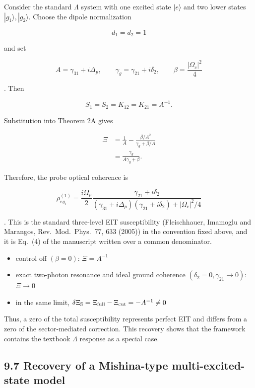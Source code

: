 \documentclass[
  10pt,
  a4paper,
]{article}
\providecommand{\tightlist}{%
  \setlength{\itemsep}{0pt}\setlength{\parskip}{0pt}}
\begin{document}
Consider the standard \(\Lambda\) system with one excited state
\(|e\rangle\) and two lower states \(|g_1\rangle,|g_2\rangle\). Choose
the dipole normalization

\[
d_1=d_2=1
\]

and set

\[
A=\gamma_{31}+i\Delta_p,
\qquad
\gamma_g=\gamma_{21}+i\delta_2,
\qquad
\beta=\frac{|\Omega_c|^2}{4}
\]

. Then

\[
S_1=S_2=K_{12}=K_{21}=A^{-1}.
\]

Substitution into Theorem 2A gives

\[
\begin{aligned}
\Xi
&=\frac1A-
\frac{\beta/A^2}{\gamma_g+\beta/A}\\
&=\boxed{
\frac{\gamma_g}{A\gamma_g+\beta}
}.
\end{aligned}
\]

Therefore, the probe optical coherence is

\[
\boxed{
\rho_{eg_1}^{(1)}
=\frac{i\Omega_p}{2}
\frac{\gamma_{21}+i\delta_2}
{(\gamma_{31}+i\Delta_p)(\gamma_{21}+i\delta_2)+|\Omega_c|^2/4}
}
\]

. This is the standard three-level EIT susceptibility (Fleischhauer,
Imamoglu and Marangos, Rev.~Mod.~Phys.~77, 633 (2005)) in the
convention fixed above, and it is Eq.~(4) of the manuscript written over a
common denominator.

\begin{itemize}
\tightlist
\item
  control off \((\beta=0)\): \(\Xi=A^{-1}\)
\item
  exact two-photon resonance and ideal ground coherence
  \((\delta_2=0,\gamma_{21}\to0)\): \(\Xi\to0\)
\item
  in the same limit,
  \(\delta\Xi_{\mathbb S}=\Xi_{\rm full}-\Xi_{\rm cut}=-A^{-1}\neq0\)
\end{itemize}

Thus, a zero of the total susceptibility represents perfect EIT and
differs from a zero of the sector-mediated correction. This recovery
shows that the framework contains the textbook \(\Lambda\) response as a
special case.

\subsection{9.7 Recovery of a Mishina-type multi-excited-state
model}\label{recovery-of-a-mishina-type-multi-excited-state-model}
\end{document}
